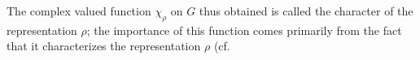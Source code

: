 The complex valued function $\chi_\rho$ on $G$ thus obtained is called the character of the representation $\rho$; the importance of this function comes primarily from the fact that it characterizes the representation $\rho$ (cf.
